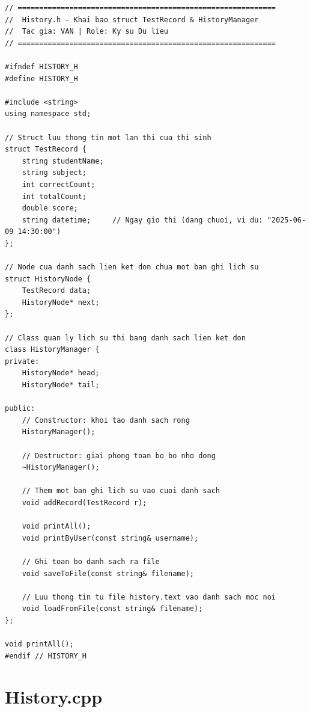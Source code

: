\documentclass[11pt]{report}
\begin{document}
\begin{lstlisting}[caption={History.h -- Khai báo struct TestRecord và HistoryManager}, label={lst:full_history_h}]
// ============================================================
//  History.h - Khai bao struct TestRecord & HistoryManager
//  Tac gia: VAN | Role: Ky su Du lieu
// ============================================================

#ifndef HISTORY_H
#define HISTORY_H

#include <string>
using namespace std;

// Struct luu thong tin mot lan thi cua thi sinh
struct TestRecord {
    string studentName;
    string subject;
    int correctCount;
    int totalCount;
    double score;
    string datetime;     // Ngay gio thi (dang chuoi, vi du: "2025-06-09 14:30:00")
};

// Node cua danh sach lien ket don chua mot ban ghi lich su
struct HistoryNode {
    TestRecord data;
    HistoryNode* next;
};

// Class quan ly lich su thi bang danh sach lien ket don
class HistoryManager {
private:
    HistoryNode* head;
    HistoryNode* tail;

public:
    // Constructor: khoi tao danh sach rong
    HistoryManager();

    // Destructor: giai phong toan bo bo nho dong
    ~HistoryManager();

    // Them mot ban ghi lich su vao cuoi danh sach
    void addRecord(TestRecord r);

    void printAll();
    void printByUser(const string& username);

    // Ghi toan bo danh sach ra file
    void saveToFile(const string& filename);

    // Luu thong tin tu file history.text vao danh sach moc noi
    void loadFromFile(const string& filename);
};

void printAll();
#endif // HISTORY_H
\end{lstlisting}

\section{History.cpp}
\end{document}
